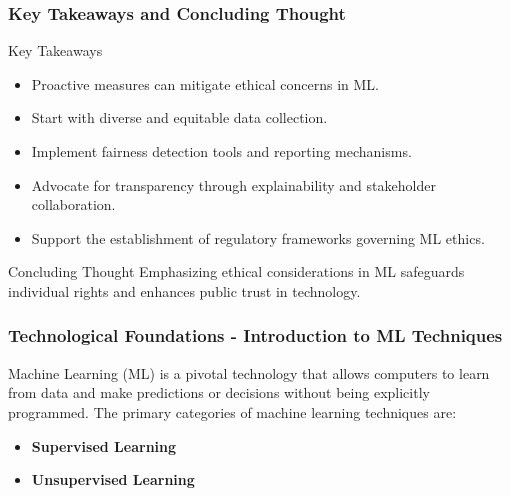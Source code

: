 \documentclass[aspectratio=169]{beamer}
\begin{document}
\begin{frame}[fragile]
    \frametitle{Key Takeaways and Concluding Thought}
    \begin{block}{Key Takeaways}
        \begin{itemize}
            \item Proactive measures can mitigate ethical concerns in ML.
            \item Start with diverse and equitable data collection.
            \item Implement fairness detection tools and reporting mechanisms.
            \item Advocate for transparency through explainability and stakeholder collaboration.
            \item Support the establishment of regulatory frameworks governing ML ethics.
        \end{itemize}
    \end{block}
    \begin{block}{Concluding Thought}
        Emphasizing ethical considerations in ML safeguards individual rights and enhances public trust in technology.
    \end{block}
\end{frame}

\begin{frame}[fragile]
    \frametitle{Technological Foundations - Introduction to ML Techniques}
    Machine Learning (ML) is a pivotal technology that allows computers to learn from data and make predictions or decisions without being explicitly programmed. The primary categories of machine learning techniques are:
    
    \begin{itemize}
        \item \textbf{Supervised Learning}
        \item \textbf{Unsupervised Learning}
    \end{itemize}
\end{frame}
\end{document}
